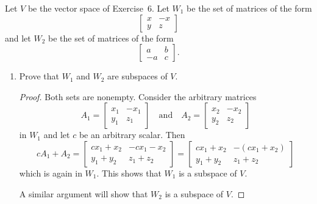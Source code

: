  Let $V$ be the vector space of Exercise~6. Let $W_1$ be the
set of matrices of the form
\begin{equation*}
  \begin{bmatrix}
    x & -x \\ y & z
  \end{bmatrix}
\end{equation*}
and let $W_2$ be the set of matrices of the form
\begin{equation*}
  \begin{bmatrix}
    a & b \\ -a & c
  \end{bmatrix}.
\end{equation*}
\begin{enumerate}
\item Prove that $W_1$ and $W_2$ are subspaces of $V$.
  \begin{proof}
    Both sets are nonempty. Consider the arbitrary matrices
    \begin{equation*}
      A_1 =
      \begin{bmatrix}
        x_1 & -x_1 \\ y_1 & z_1
      \end{bmatrix}
      \quad\text{and}\quad
      A_2 =
      \begin{bmatrix}
        x_2 & -x_2 \\ y_2 & z_2
      \end{bmatrix}
    \end{equation*}
    in $W_1$ and let $c$ be an arbitrary scalar. Then
    \begin{equation*}
      cA_1 + A_2 =
      \begin{bmatrix}
        cx_1 + x_2 & -cx_1 - x_2 \\ y_1 + y_2 & z_1 + z_2
      \end{bmatrix}
      =
      \begin{bmatrix}
        cx_1 + x_2 & -(cx_1 + x_2) \\ y_1 + y_2 & z_1 + z_2
      \end{bmatrix}
    \end{equation*}
    which is again in $W_1$. This shows that $W_1$ is a subspace of
    $V$.

    A similar argument will show that $W_2$ is a subspace of $V$.
  \end{proof}


\end{enumerate}

